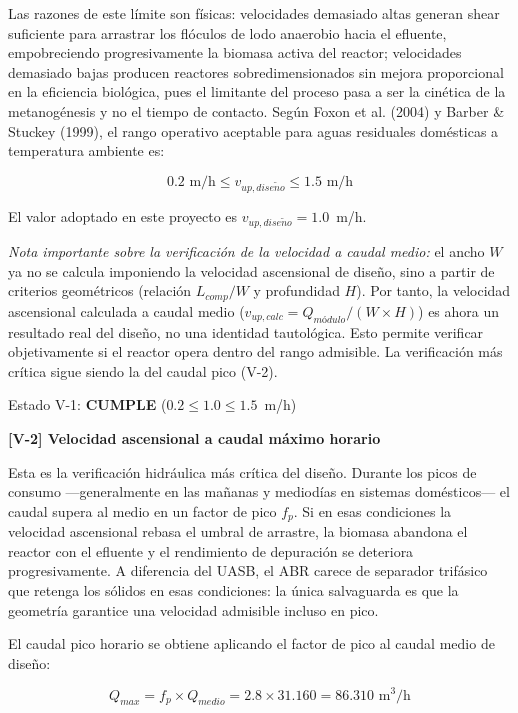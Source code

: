 \documentclass[12pt,a4paper]{article}
\begin{document}
Las razones de este límite son físicas: velocidades demasiado altas generan shear suficiente para arrastrar los flóculos de lodo anaerobio hacia el efluente, empobreciendo progresivamente la biomasa activa del reactor; velocidades demasiado bajas producen reactores sobredimensionados sin mejora proporcional en la eficiencia biológica, pues el limitante del proceso pasa a ser la cinética de la metanogénesis y no el tiempo de contacto. Según Foxon et al. (2004) y Barber \& Stuckey (1999), el rango operativo aceptable para aguas residuales domésticas a temperatura ambiente es:

\begin{equation}
0.2 \text{ m/h} \leq v_{up,dise\tilde{n}o} \leq 1.5 \text{ m/h}
\end{equation}

El valor adoptado en este proyecto es $v_{up,dise\tilde{n}o} = 1.0$~m/h.

\textit{Nota importante sobre la verificación de la velocidad a caudal medio:} el ancho $W$ ya no se calcula imponiendo la velocidad ascensional de diseño, sino a partir de criterios geométricos (relación $L_{comp}/W$ y profundidad $H$). Por tanto, la velocidad ascensional calculada a caudal medio ($v_{up,calc} = Q_{módulo} / (W \times H)$) es ahora un resultado real del diseño, no una identidad tautológica. Esto permite verificar objetivamente si el reactor opera dentro del rango admisible. La verificación más crítica sigue siendo la del caudal pico (V-2).

Estado V-1: \textbf{CUMPLE} ($0.2 \leq 1.0 \leq 1.5$~m/h)

\textbf{[V-2] Velocidad ascensional a caudal máximo horario}

Esta es la verificación hidráulica más crítica del diseño. Durante los picos de consumo ---generalmente en las mañanas y mediodías en sistemas domésticos--- el caudal supera al medio en un factor de pico $f_p$. Si en esas condiciones la velocidad ascensional rebasa el umbral de arrastre, la biomasa abandona el reactor con el efluente y el rendimiento de depuración se deteriora progresivamente. A diferencia del UASB, el ABR carece de separador trifásico que retenga los sólidos en esas condiciones: la única salvaguarda es que la geometría garantice una velocidad admisible incluso en pico.

El caudal pico horario se obtiene aplicando el factor de pico al caudal medio de diseño:

\begin{equation}
Q_{max} = f_p \times Q_{medio} = 2.8 \times 31.160 = 86.310 \text{ m}^3\text{/h}
\end{equation}
\end{document}
